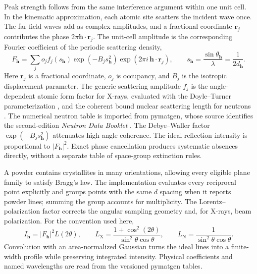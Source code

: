 \documentclass[10pt]{article}
\begin{document}
Peak strength follows from the same interference argument within one unit
cell. In the kinematic approximation, each atomic site scatters the incident
wave once. The far-field waves add as complex amplitudes, and a fractional
coordinate $\mathbf{r}_j$ contributes the phase
$2\pi\mathbf{h}\cdot\mathbf{r}_j$. The unit-cell amplitude is the corresponding
Fourier coefficient of the periodic scattering density,
\begin{equation}
F_{\mathbf{h}} = \sum_j o_j f_j(s_{\mathbf h})
\exp(-B_j s_{\mathbf h}^2)
\exp(2\pi i\,\mathbf{h}\cdot\mathbf{r}_j),
\qquad s_{\mathbf h} = \frac{\sin\theta_{\mathbf h}}{\lambda}
=\frac{1}{2d_{\mathbf h}}.
\end{equation}
Here $\mathbf r_j$ is a fractional coordinate, $o_j$ is occupancy, and $B_j$ is
the isotropic displacement parameter. The generic scattering amplitude $f_j$
is the angle-dependent atomic form factor for X-rays, evaluated with the
Doyle--Turner parameterization \citep{doyle1968}, and the coherent bound
nuclear scattering length for neutrons \citep{sears1992}. The numerical
neutron table is imported from pymatgen, whose source identifies the
second-edition \emph{Neutron Data Booklet} \citep{dianoux2003}. The
Debye--Waller factor
$\exp(-B_js_{\mathbf h}^2)$ attenuates high-angle coherence. The ideal
reflection intensity is proportional to $|F_{\mathbf h}|^2$. Exact phase
cancellation produces systematic absences directly, without a separate table
of space-group extinction rules.

A powder contains crystallites in many orientations, allowing every eligible
plane family to satisfy Bragg's law. The implementation evaluates every
reciprocal point explicitly and groups points with the same $d$ spacing when it
reports powder lines; summing the group accounts for multiplicity. The
Lorentz--polarization factor corrects the angular sampling geometry and, for
X-rays, beam polarization. For the convention used here,
\begin{equation}
I_{\mathbf{h}}=|F_{\mathbf{h}}|^2L(2\theta),\qquad
L_{\mathrm{X}}=\frac{1+\cos^2(2\theta)}{\sin^2\theta\cos\theta},\qquad
L_{\mathrm{N}}=\frac{1}{\sin^2\theta\cos\theta}.
\end{equation}
Convolution with an area-normalized Gaussian turns the ideal lines into a
finite-width profile while preserving integrated intensity. Physical
coefficients and named wavelengths are read from the versioned pymatgen tables.
\end{document}

